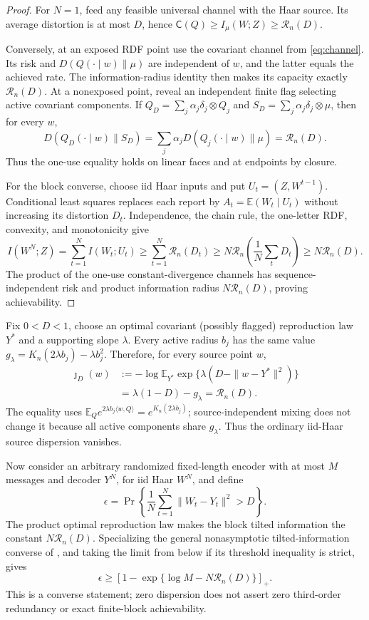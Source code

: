 \documentclass[11pt,a4paper]{article}
\newcommand{\RDF}{\mathcal R}
\newcommand{\E}{\mathbb E}
\begin{document}
\begin{proof}
For $N=1$, feed any feasible universal channel with the Haar source.  Its
average distortion is at most $D$, hence
$\mathsf C(Q)\ge I_\mu(W;Z)\ge\RDF_n(D)$.

Conversely, at an exposed RDF point use the covariant channel from
\cref{eq:channel}.  Its risk and
$D(Q(\cdot\mid w)\|\mu)$ are independent of $w$, and the latter equals the
achieved rate.  The information-radius identity then makes its capacity
exactly $\RDF_n(D)$.  At a nonexposed point, reveal an independent finite flag
selecting active covariant components.  If
$Q_D=\sum_j\alpha_j\delta_j\otimes Q_j$ and
$S_D=\sum_j\alpha_j\delta_j\otimes\mu$, then for every $w$,
\[
 D(Q_D(\cdot\mid w)\|S_D)
 =\sum_j\alpha_jD(Q_j(\cdot\mid w)\|\mu)
 =\RDF_n(D).
\]
Thus the one-use equality holds on linear faces and at endpoints by closure.

For the block converse, choose iid Haar inputs and put
$U_t=(Z,W^{t-1})$.  Conditional least squares replaces each report by
$A_t=\E(W_t\mid U_t)$ without increasing its distortion $D_t$.  Independence,
the chain rule, the one-letter RDF, convexity, and monotonicity give
\[
 I(W^N;Z)=\sum_{t=1}^NI(W_t;U_t)
 \ge\sum_{t=1}^N\RDF_n(D_t)
 \ge N\RDF_n\!\left(\frac1N\sum_tD_t\right)
 \ge N\RDF_n(D).
\]
The product of the one-use constant-divergence channels has
sequence-independent risk and product information radius
$N\RDF_n(D)$, proving achievability.
\end{proof}

Fix $0<D<1$, choose an optimal covariant (possibly flagged) reproduction
law $Y^*$ and a supporting slope $\lambda$.  Every active radius $b_j$ has
the same value
$g_\lambda=K_n(2\lambda b_j)-\lambda b_j^2$.  Therefore, for every source
point $w$,
\[
\begin{split}
 \jmath_D(w)
 &:=-\log\E_{Y^*}\exp\{\lambda(D-\|w-Y^*\|^2)\}\\
 &=\lambda(1-D)-g_\lambda=\RDF_n(D).
\end{split}
\]
The equality uses
$\E_Qe^{2\lambda b_j\langle w,Q\rangle}=e^{K_n(2\lambda b_j)}$;
source-independent mixing does not change it because all active components
share $g_\lambda$.  Thus the ordinary iid-Haar source dispersion vanishes.

Now consider an arbitrary randomized fixed-length encoder with at most $M$
messages and decoder $Y^N$, for iid Haar $W^N$, and define
\[
 \epsilon=\Pr\!\left\{\frac1N\sum_{t=1}^N
 \|W_t-Y_t\|^2>D\right\}.
\]
The product optimal reproduction law makes the block tilted information the
constant $N\RDF_n(D)$.  Specializing the general nonasymptotic
tilted-information converse of \cite{KostinaVerdu2012}, and taking the limit
from below if its threshold inequality is strict, gives
\begin{equation}\label{eq:strongconverse}
 \epsilon\ge
 \left[1-\exp\{\log M-N\RDF_n(D)\}\right]_+.
\end{equation}
This is a converse statement; zero dispersion does not assert zero
third-order redundancy or exact finite-block achievability.
\end{document}
